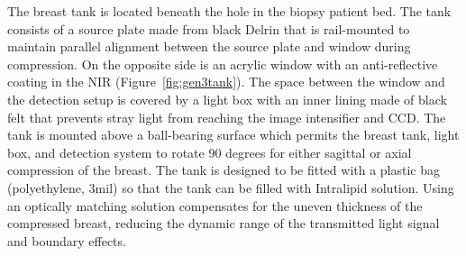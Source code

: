 The breast tank is located beneath the hole in the biopsy patient bed. The tank consists of a source plate made from black Delrin that is rail-mounted to maintain parallel alignment between the source plate and window during compression. On the opposite side is an acrylic window with an anti-reflective coating in the NIR (Figure~\ref{fig:gen3tank}). The space between the window and the detection setup is covered by a light box with an inner lining made of black felt that prevents stray light from reaching the image intensifier and CCD. The tank is mounted above a ball-bearing surface which permits the breast tank, light box, and detection system to rotate 90 degrees for either sagittal or axial compression of the breast. The tank is designed to be fitted with a plastic bag (polyethylene, 3mil) so that the tank can be filled with Intralipid solution. Using an optically matching solution compensates for the uneven thickness of the compressed breast, reducing the dynamic range of the transmitted light signal and boundary effects.
%
